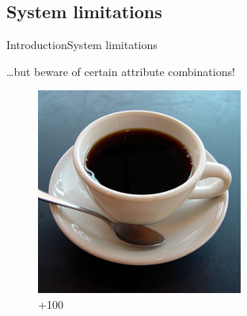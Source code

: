 \subsection{System limitations}
\begin{frame}{Introduction}{System limitations}

\ldots{}but beware of certain attribute combinations!

\vspace{0.5cm}

\begin{figure}[ht]
\begin{minipage}[b]{0.3\linewidth}
\centering
\includegraphics[width=\textwidth]{img/introduction/coffee.png}
\\{\color{green}+100}
\end{minipage}
\hspace{0.5cm}
\begin{minipage}[b]{0.3\linewidth}
\centering

\end{minipage}
\end{figure}
\end{frame}
